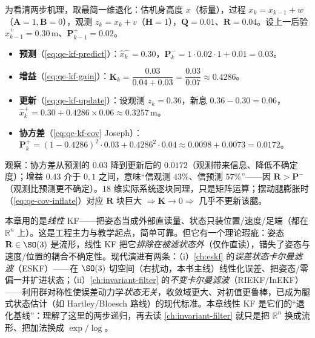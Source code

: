 \begin{example}\label{exam:qe-kf-step}
为看清两步机理，取最简一维退化：估机身高度 $x$（标量），过程 $x_k=x_{k-1}+w$（$\mathbf{A}=1,\mathbf{B}=0$），观测 $z_k=x_k+v$（$\mathbf{H}=1$），$\mathbf{Q}=0.01$、$\mathbf{R}=0.04$。设上一后验 $\hat x_{k-1}^+=0.30\,\mathrm{m}$、$\mathbf{P}_{k-1}^+=0.02$。
\begin{itemize}
  \item \textbf{预测}（\cref{eq:qe-kf-predict}）：$\hat x_k^-=0.30$，$\mathbf{P}_k^-=1\cdot0.02\cdot1+0.01=0.03$。
  \item \textbf{增益}（\cref{eq:qe-kf-gain}）：$\mathbf{K}_k=\dfrac{0.03}{0.04+0.03}=\dfrac{0.03}{0.07}\approx0.4286$。
  \item \textbf{更新}（\cref{eq:qe-kf-update}）：设观测 $z_k=0.36$，新息 $0.36-0.30=0.06$，$\hat x_k^+=0.30+0.4286\times0.06\approx0.3257\,\mathrm{m}$。
  \item \textbf{协方差}（\cref{eq:qe-kf-cov} Joseph）：$\mathbf{P}_k^+=(1-0.4286)^2\cdot0.03+0.4286^2\cdot0.04\approx0.0098+0.0073=0.0172$。
\end{itemize}
观察：协方差从预测的 $0.03$ 降到更新后的 $0.0172$（观测带来信息、降低不确定度）；增益 $0.43$ 介于 $0,1$ 之间，意味“信观测 $43\%$、信预测 $57\%$”——因 $\mathbf{R}>\mathbf{P}^-$（观测比预测更不确定）。$18$ 维实际系统逐块同理，只是矩阵运算；摆动腿膨胀时（\cref{eq:qe-cov-inflate}）对应 $\mathbf{R}$ 块巨大 $\Rightarrow\mathbf{K}\to0\Rightarrow$ 几乎不更新该腿。
\end{example}

\begin{insight}\label{ins:qe-inekf}
本章用的是\emph{线性} KF——把姿态当成外部直读量、状态只装位置/速度/足端（都在 $\mathbb{R}^n$ 上）。这是工程主力与教学起点，简单可靠。但它有一个理论瑕疵：姿态 $\mathbf{R}\in\SO(3)$ 是流形，线性 KF 把它\emph{排除在被滤状态外}（仅作直读），错失了姿态与速度/位置的耦合不确定性。现代演进有两条：（i）\cref{ch:eskf} 的\emph{误差状态卡尔曼滤波}（ESKF）——在 $\SO(3)$ 切空间（右扰动，本书主线）线性化误差、把姿态/零偏一并扩进状态；（ii）\cref{ch:invariant-filter} 的\emph{不变卡尔曼滤波}（RIEKF/InEKF）——利用群对称性使误差动力学\emph{状态无关}，收敛域更大、对初值更鲁棒，已成为腿式状态估计（如 Hartley/Bloesch 路线\cite{bloesch2013state}）的现代标准。本章线性 KF 是它们的“退化基线”：理解了这里的两步递归，再去读 \cref{ch:invariant-filter} 就只是把 $\mathbb{R}^n$ 换成流形、把加法换成 $\exp/\log$。
\end{insight}

